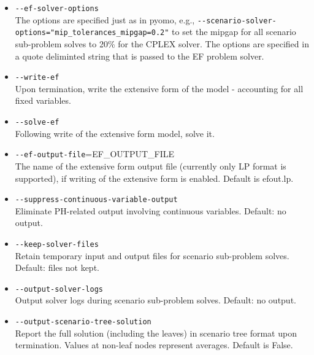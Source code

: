 \begin{itemize}
  \item \verb|--ef-solver-options|                                           \\
  The options are specified just as in pyomo, e.g.,
  \verb|--scenario-solver-options="mip_tolerances_mipgap=0.2"| to set the mipgap
  for all scenario sub-problem solves to 20\% for the CPLEX solver. The options
  are specified in a quote deliminted string that is passed to the EF problem
  solver.

  \item \verb|--write-ef|                                                    \\
  Upon termination, write the extensive form of the model - accounting for all
  fixed variables.

  \item \verb|--solve-ef|                                                    \\
  Following write of the extensive form model, solve it.

  \item \verb|--ef-output-file|=EF\_OUTPUT\_FILE                             \\
  The name of the extensive form output file (currently only LP format is
  supported), if writing of the extensive form is enabled. Default is efout.lp.

  \item \verb|--suppress-continuous-variable-output|                         \\
  Eliminate PH-related output involving continuous variables. Default: no
  output.

  \item \verb|--keep-solver-files|                                           \\
  Retain temporary input and output files for scenario sub-problem solves.
  Default: files not kept.

  \item \verb|--output-solver-logs|                                          \\
  Output solver logs during scenario sub-problem solves. Default: no output.

  \item \verb|--output-scenario-tree-solution|                                 \\
     Report the full solution (including the leaves) in scenario tree format upon termination. Values at non-leaf nodes represent averages. Default is False.


\end{itemize}
